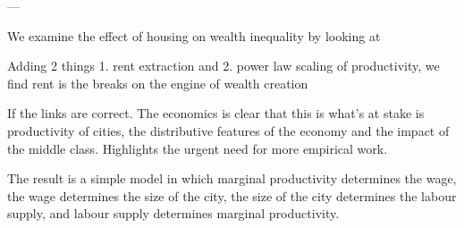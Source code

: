 



---


We examine the effect of housing on wealth inequality by looking at 

Adding 2 things 1. rent extraction and 2. power law scaling of productivity, we find rent is the breaks on the engine of wealth creation

If the links are correct. 
The economics is clear that this is what's at stake is productivity of cities, the distributive features of the economy and the impact of the middle class.
Highlights the urgent need for more empirical work.

The result is a simple model in which marginal productivity determines the wage, the wage determines the size of the city, the size of the city determines the labour supply, and labour supply determines marginal productivity. 



